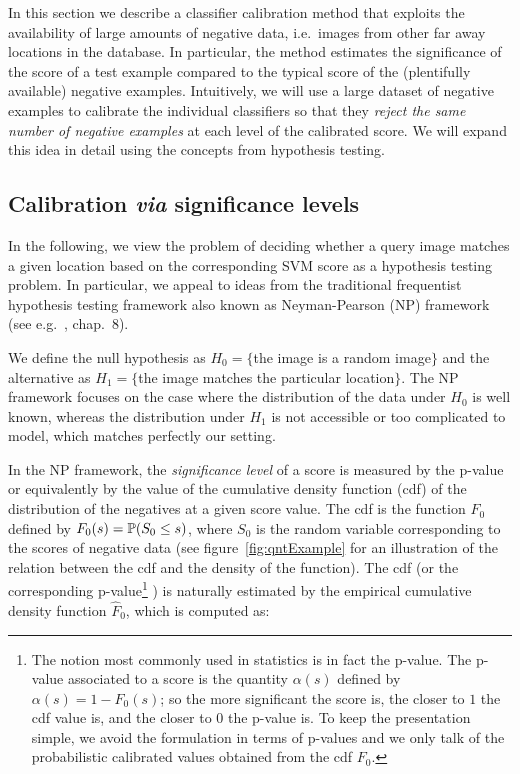 In this section we describe a classifier calibration method that exploits the availability of large amounts of negative data, i.e.\ images from other far away locations in the database.
In particular, the method estimates the significance of the score of a test example compared to the typical score of  the (plentifully available) negative examples. Intuitively, we will use a large dataset of negative examples to calibrate the individual classifiers so that they {\em reject the same number of negative examples} at each level of the calibrated score.   We will expand this idea in detail using the concepts from hypothesis testing. %
   \subsection{Calibration \emph{via} significance levels}
      In the following, we view  the problem of deciding whether a query image matches a given location based on the corresponding SVM score as a hypothesis testing problem. In particular, we appeal to ideas from the traditional frequentist hypothesis testing framework also known as Neyman-Pearson (NP) framework (see e.g.~\cite{casella2001statistical}, chap.~8).

      We define the null hypothesis as $H_0=\{$the image is a random image$\}$ and the alternative as $H_1=\{$the image matches the particular location$\}$. The NP framework focuses on the case where the distribution of the data under $H_0$ is well known, whereas the distribution under $H_1$ is not accessible or too complicated to model, which matches perfectly our setting.

      In the NP framework, the \emph{significance level} of a score is measured by the p-value or equivalently by the value of the cumulative density function  (cdf) of the distribution of the negatives at a given score value. The cdf is the function $F_0$ defined by $F_0(s)=\mathbb{P}(S_0\leq s)$, where $S_0$ is the random variable corresponding to the scores of negative data (see figure~\ref{fig:qntExample} for an illustration of the relation between the cdf and the density of the function). The cdf 
      (or the corresponding p-value\footnote{
        The notion most commonly used in statistics is in fact the p-value. The p-value associated to a score is the quantity $\alpha(s)$ defined by $\alpha(s)=1-F_0(s)$; so the more significant the score is, the closer to $1$ the cdf value is, and the closer to $0$ the p-value is. To keep the presentation simple, we avoid the formulation in terms of p-values and we only talk of the probabilistic calibrated values obtained from the cdf $F_0$.
       }%
       )
      is naturally estimated by the empirical cumulative density function $\hat{F}_0$, which is computed as: 
      
